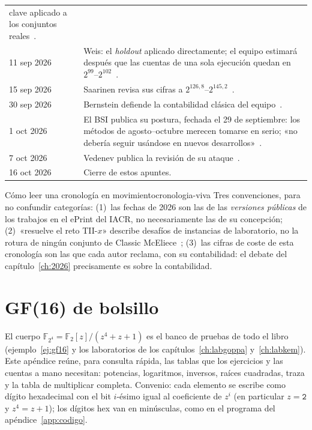 \documentclass[11pt,a4paper,oneside]{report}
\newcommand{\F}{\mathbb{F}}
\newcommand{\FF}[1]{\F_{2^{#1}}}
\begin{document}
\begin{longtable}{@{}p{2.6cm}p{12.96cm}@{}}
  clave aplicado a los conjuntos reales~\cite{ghoshal2026}.\\
11 sep 2026 & Weis: el \emph{holdout} aplicado directamente; el
  equipo estimará después que las cuentas de una sola ejecución
  quedan en $2^{99}$--$2^{102}$~\cite{weis2026}.\\
15 sep 2026 & Saarinen revisa sus cifras a
  $2^{126{,}8}$--$2^{145{,}2}$~\cite{saarinen2026b}.\\
30 sep 2026 & Bernstein defiende la contabilidad clásica del
  equipo~\cite{bernstein2026}.\\
1 oct 2026 & El BSI publica su postura, fechada el 29 de septiembre:
  los métodos de agosto--octubre merecen tomarse en serio; «no debería
  seguir usándose en nuevos desarrollos»~\cite{bsi2026}.\\
7 oct 2026 & Vedenev publica la revisión de su
  ataque~\cite{vedenev2026}.\\
16 oct 2026 & Cierre de estos apuntes.\\
\end{longtable}

\begin{observacion}{Cómo leer una cronología en movimiento}{cronologia-viva}
Tres convenciones, para no confundir categorías:
(1)~las fechas de 2026 son las de las \emph{versiones públicas} de
los trabajos en el ePrint del IACR, no necesariamente las de su
concepción;
(2)~«resuelve el reto TII-$x$» describe desafíos de instancias de
laboratorio, no la rotura de ningún conjunto de
Classic McEliece~\cite{bardet2026,saarinen2026b};
(3)~las cifras de coste de esta cronología son las que cada autor
reclama, con su contabilidad: el debate del
capítulo~\ref{ch:2026} precisamente es sobre la contabilidad.
\end{observacion}


\chapter{GF(16) de bolsillo}\label{app:gf16}

El cuerpo $\FF4=\F_2[z]/(z^4+z+1)$ es el banco de pruebas de todo el
libro (ejemplo~\ref{ej:gf16} y los laboratorios de los
capítulos~\ref{ch:labgoppa} y~\ref{ch:labkem}). Este apéndice reúne,
para consulta rápida, las tablas que los ejercicios y las cuentas a
mano necesitan: potencias, logaritmos, inversos, raíces cuadradas,
traza y la tabla de multiplicar completa. Convenio: cada elemento se
escribe como dígito hexadecimal con el bit $i$-ésimo igual al
coeficiente de $z^i$ (en particular $z=\mathtt{2}$ y $z^4=z+1$); los
dígitos hex van en minúsculas, como en el programa del
apéndice~\ref{app:codigo}.
\end{document}
